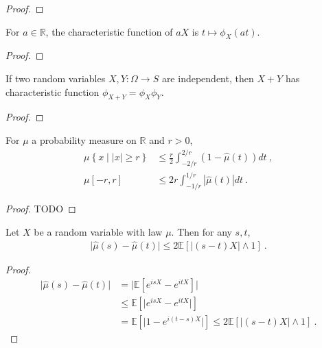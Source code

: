 \begin{proof}\leanok
\end{proof}


\begin{lemma}\label{lem:charFun_smul}
\leanok
{}
For $a \in \mathbb{R}$, the characteristic function of $a X$ is $t \mapsto \phi_X(at)$.
\end{lemma}

\begin{proof}\leanok
\end{proof}


\begin{lemma}\label{lem:charFun_add_of_indep}
\leanok
{}
If two random variables $X, Y : \Omega \to S$ are independent, then $X+Y$ has characteristic function $\phi_{X+Y} = \phi_X \phi_Y$. 
\end{lemma}

\begin{proof}\leanok
\end{proof}


\begin{lemma}\label{lem:charFun_bound}
For $\mu$ a probability measure on $\mathbb{R}$ and $r > 0$,
\begin{align*}
\mu \left\{x \mid |x| \ge r\right\}
&\le \frac{r}{2} \int_{-2/r}^{2/r} (1 - \hat{\mu}(t))dt
\: , \\
\mu [-r, r]
&\le 2 r \int_{-1/r}^{1/r} |\hat{\mu}(t)| dt
\: .
\end{align*}
\end{lemma}

\begin{proof}
TODO
\end{proof}


\begin{lemma}\label{lem:abs_sub_charFun}
Let $X$ be a random variable with law $\mu$. Then for any $s, t$,
\begin{align*}
\vert \hat{\mu}(s) - \hat{\mu}(t) \vert
\le 2 \mathbb{E}\left[ \left\vert (s - t) X\right\vert \wedge 1\right]
\: .
\end{align*}
\end{lemma}

\begin{proof}
\begin{align*}
\vert \hat{\mu}(s) - \hat{\mu}(t) \vert
&= \vert \mathbb{E}\left[e^{isX} - e^{itX}\right] \vert
\\
&\le \mathbb{E}\left[\vert e^{isX} - e^{itX} \vert\right]
\\
&= \mathbb{E}\left[\vert 1 - e^{i(t - s)X} \vert\right]
\le 2 \mathbb{E}\left[ \left\vert (s - t) X\right\vert \wedge 1\right]
\: .
\end{align*}
\end{proof}



